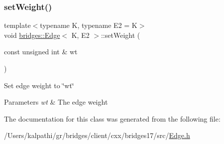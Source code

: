 \subsubsection{\texorpdfstring{set\+Weight()}{setWeight()}}
{\footnotesize\ttfamily template$<$typename K, typename E2 = K$>$ \\
void \mbox{\hyperlink{classbridges_1_1_edge}{bridges\+::\+Edge}}$<$ K, E2 $>$\+::set\+Weight (\begin{DoxyParamCaption}\item[{const unsigned int \&}]{wt }\end{DoxyParamCaption})\hspace{0.3cm}{\ttfamily [inline]}}

Set edge weight to \char`\"{}wt\char`\"{}


\begin{DoxyParams}{Parameters}
{\em wt} & The edge weight \\
\hline
\end{DoxyParams}


The documentation for this class was generated from the following file\+:\begin{DoxyCompactItemize}
\item 
/\+Users/kalpathi/gr/bridges/client/cxx/bridges17/src/\mbox{\hyperlink{_edge_8h}{Edge.\+h}}\end{DoxyCompactItemize}
